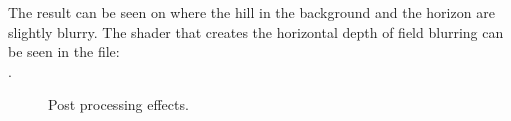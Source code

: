 The result can be seen on  where the hill in
the background and the horizon are slightly blurry. The shader that
creates the horizontal depth of field blurring can be seen in the file:\\
.

\begin{figure}
  \centering
  \caption{Post processing effects.}
  \label{fig:dofMotionBlur}
\end{figure}



